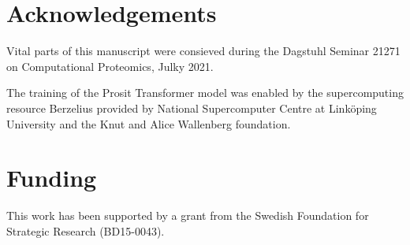\documentclass[10pt,a4paper]{article}
\begin{document}
\section*{Acknowledgements}
Vital parts of this manuscript were consieved during the Dagstuhl Seminar 21271 on Computational Proteomics, Julky 2021. 

The training of the Prosit Transformer model was enabled by the supercomputing resource Berzelius provided by National Supercomputer Centre at Linköping University and the Knut and Alice Wallenberg foundation.

\section*{Funding}

This work has been supported by a grant from the Swedish Foundation for Strategic Research (BD15-0043).




\end{document}
